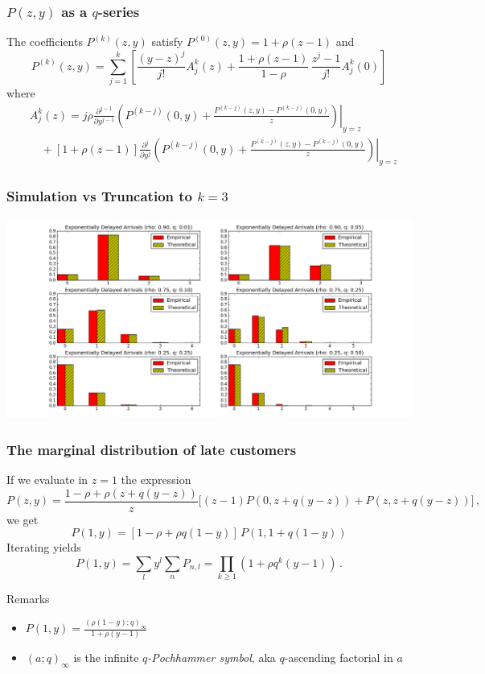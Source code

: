 \documentclass[table,aspectratio=169]{beamer}
\begin{document}
\begin{frame}[t]\frametitle{$P(z,y)$ as a $q$-series}
    \begin{theorem}[Lancia, 2013]
        The coefficients $P^{(k)}(z,y)$ satisfy $P^{(0)}(z,y) = 1+\rho(z-1)$ and
        \begin{equation*}
            P^{(k)}(z,y) = \sum_{j=1}^k\left[ \frac{(y-z)^j}{j!}A_j^k(z)
            +\frac{1+\rho(z-1)}{1-\rho}\,
            \frac{z^j-1}{j!}A_j^k(0)\right]
        \end{equation*}
        where
        \begin{align*}
            &A^k_j(z) =  j\rho \frac{\partial^{j-1}}{\partial y^{j-1}}\left.\left(P^{(k-j)}(0,y) +
            \frac{P^{(k-j)}(z,y)-P^{(k-j)}(0,y)}{z}\right)\right|_{y=z}\\
            &\quad+ [1+\rho(z-1)] \frac{\partial^j}{\partial y^j}\left.\left(P^{(k-j)}(0,y) +
            \frac{P^{(k-j)}(z,y)-P^{(k-j)}(0,y)}{z}\right)\right|_{y=z}
        \end{align*}
    \end{theorem}
\end{frame}

\begin{frame}[t]\frametitle{Simulation vs Truncation to $k=3$}
    \centering
    \includegraphics[width=.9\textwidth]{compare}
\end{frame}

\begin{frame}[t]\frametitle{The marginal distribution of late customers}
    If we evaluate in $z=1$ the expression
    \[P(z,y)= \frac{1 - \rho + \rho(z+q(y-z))}{z}\Big[ (z-1)P(0,z+q(y-z))
    + P(z, z+q(y-z))\Big]\,,\]
    we get
    \[P(1,y) = [1 - \rho + \rho q (1-y)] \, P(1, 1 + q(1-y))\]
    Iterating yields
    \[P(1,y) = \sum_l y^l \sum_n P_{n,l} = \prod_{k\geq1}(1+\rho q^k(y-1))\,.\]

    \begin{alertblock}{Remarks}
        \begin{itemize}
            \item $P(1,y) = \frac{(\rho(1-y);q)_\infty}{1+\rho(y-1)}$
            \item $(a;q)_\infty$ is the infinite \emph{$q$-Pochhammer symbol},
            aka $q$-ascending factorial in $a$
        \end{itemize}
    \end{alertblock}
\end{frame}
\end{document}
